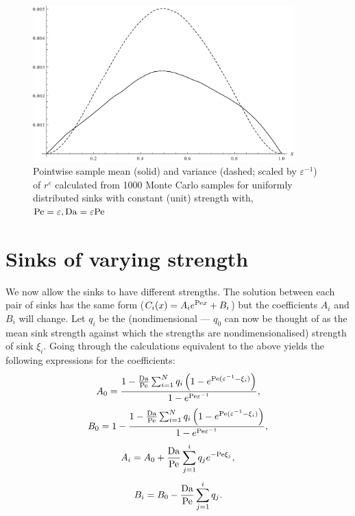 \begin{figure}[ht!]
    \centering
    \includegraphics[width=0.9\textwidth]{continuum/figures/loc_uniform_dist/av_res_var_1000_samples}
    \caption{\label{fig:loc_uniform_1000_av_residuals}Pointwise sample mean
    (solid) and variance (dashed; scaled by \(\varepsilon^{-1}\)) of
    \(r^\varepsilon\) calculated from 1000 Monte Carlo samples for uniformly
    distributed sinks with constant (unit) strength with, \({\mathrm{Pe}=\varepsilon},
    {\mathrm{Da}=\varepsilon\mathrm{Pe}}\)}
\end{figure}

\FloatBarrier

\section{Sinks of varying strength}

We now allow the sinks to have different strengths. The solution between each
pair of sinks has the same form (\(C_i(x)=A_i e^{\mathrm{Pe} x} + B_i\)) but the
coefficients \(A_i\) and \(B_i\) will change. Let \(q_i\) be the
(nondimensional --- \(q_0\) can now be thought of as the mean sink strength
against which the strengths are nondimensionalised) strength of sink \(\xi_i\).
Going through the calculations equivalent to the above yields the following
expressions for the coefficients:
\begin{equation}
    \label{eqn:varying_strength_A_0}
    A_0 = \frac{1 -
        \frac{\mathrm{Da}}{\mathrm{Pe}} \sum_{i=1}^N q_i \left(1 - e^{\mathrm{Pe}(\varepsilon^{-1}
        -\xi_i)}\right)}{1 - e^{\mathrm{Pe} \varepsilon^{-1}}},
\end{equation}
\begin{equation}
    \label{eqn:varying_strength_B_0}
    B_0 = 1 - \frac{1 -
        \frac{\mathrm{Da}}{\mathrm{Pe}} \sum_{i=1}^N q_i \left(1 - e^{\mathrm{Pe}(\varepsilon^{-1}
        -\xi_i)}\right)}{1 - e^{\mathrm{Pe} \varepsilon^{-1}}},
\end{equation}
\begin{equation}
    \label{eqn:varying_strength_A_i}
    A_i = A_0 + \frac{\mathrm{Da}}{\mathrm{Pe}}\sum_{j=1}^i q_j e^{-\mathrm{Pe} \xi_j},
\end{equation}
\begin{equation}
    \label{eqn:varying_strength_B_i}
    B_i = B_0 - \frac{\mathrm{Da}}{\mathrm{Pe}} \sum_{j=1}^i q_j.
\end{equation}

